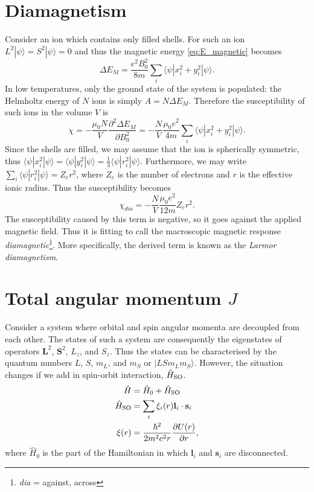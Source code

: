 \section{Diamagnetism}
Consider an ion which contains only filled shells. For such an ion $L^2|\psi\rangle = S^2|\psi\rangle = 0$ and thus the magnetic energy \eqref{eq:E_magnetic} becomes
\begin{equation}
\Delta E_M = \frac{e^2 B_0^2}{8 m}\sum_i \langle \psi | x_i^2 + y_i^2 | \psi \rangle.
\end{equation}
In low temperatures, only the ground state of the system is populated: the Helmholtz energy of $N$ ions is simply $A = N\Delta E_M$. Therefore the susceptibility of such ions in the volume $V$ is
\begin{equation}
\chi = -\frac{\mu_0 N}{V} \frac{\partial^2 \Delta E_M}{\partial B_0^2}
= -\frac{N}{V} \frac{\mu_0 e^2}{4 m}\sum_i \langle \psi | x_i^2 + y_i^2 | \psi \rangle.
\end{equation}
Since the shells are filled, we may assume that the ion is spherically symmetric, thus $\langle \psi | x_i^2| \psi \rangle = \langle \psi | y_i^2 | \psi \rangle = \frac{1}{3} \langle \psi | r_i^2| \psi \rangle $. Furthermore, we may write $\sum_i \langle \psi | r_i^2| \psi \rangle = Z_{e} r^2$, where $Z_{e}$ is the number of electrons and $r$ is the effective ionic radius. Thus the susceptibility becomes
\begin{equation}
\chi_{dia} =  -\frac{N}{V} \frac{\mu_0  e^2}{12 m} Z_{e} r^2.
\end{equation}
The susceptibility caused by this term is negative, so it goes against the applied magnetic field. Thus it is fitting to call the macroscopic magnetic response \emph{diamagnetic}\footnote{\emph{dia} = against, across}. More specifically, the derived term is known as the \emph{Larmor diamagnetism}.


\section{Total angular momentum $J$}

Consider a system where orbital and spin angular momenta are decoupled from each other. The states of such a system are consequently the eigenstates of operators $\mathbf{L}^2$, $\mathbf{S}^2$, $L_z$, and  $S_z$. Thus the states can be characterised by the quantum numbers $L$, $S$, $m_L$, and $m_S$  or $|LSm_Lm_S\rangle$. However, the situation changes if we add in spin-orbit interaction, $\Hat{H}_{\rm SO}$. 
\begin{align}
\hat{H} &= \hat{H}_0 + \Hat{H}_{\rm SO}\\
\Hat{H}_{\rm SO} &= \sum_i\xi_i(r) \mathbf{l}_i \cdot \mathbf{s}_i\\
\xi(r) &= \frac{\hbar^2}{2m^2c^2r}\frac{\partial U(r)}{\partial r},
\end{align}
where $\hat{H}_0$ is the part of the Hamiltonian in which $\mathbf{l}_i$ and $\mathbf{s}_i$ are disconnected.

